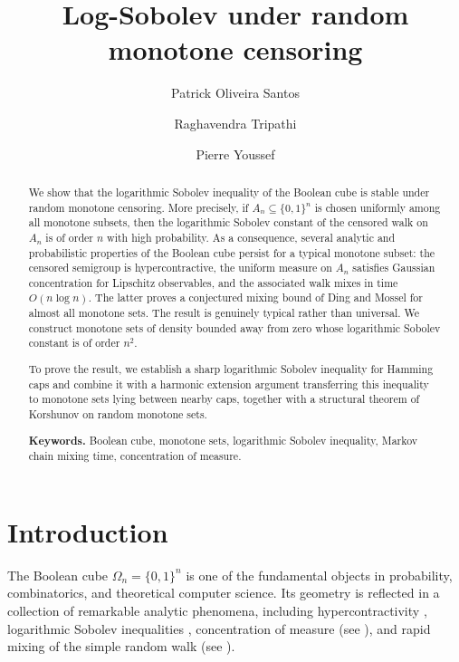 \documentclass[12pt,final]{amsart}
\title{Log-Sobolev under random monotone censoring}
\author[P. O. Santos, R. Tripathi, and P. Youssef]{Patrick Oliveira Santos \and Raghavendra Tripathi \and Pierre Youssef}
\newcommand{\1}{\mathbf{1}}
\begin{document}
\begin{abstract}
We show that the logarithmic Sobolev inequality of the Boolean cube is stable under random monotone censoring. More precisely, if $A_n\subseteq \{0,1\}^n$ is chosen uniformly among all monotone subsets, then the logarithmic Sobolev constant of the censored walk on $A_n$ is of order $n$ with high probability. 
As a consequence, several analytic and probabilistic properties of the Boolean cube persist for a typical monotone subset: the censored semigroup is hypercontractive, the uniform measure on $A_n$  satisfies Gaussian concentration for Lipschitz observables, and the associated walk mixes in time $O(n\log n)$. The latter proves a conjectured mixing bound of Ding and Mossel for almost all monotone sets. 
The result is genuinely typical rather than universal. We construct monotone sets of density bounded away from zero whose logarithmic Sobolev constant is of order $n^2$. 

To prove the result, we establish a sharp logarithmic Sobolev inequality for Hamming caps and combine it with a harmonic extension argument transferring this inequality to monotone sets lying between nearby caps, together with a structural theorem of Korshunov on random monotone sets.

\smallskip
\noindent \textbf{Keywords.} Boolean cube, monotone sets, logarithmic Sobolev inequality, Markov chain mixing time, concentration of measure.
\end{abstract}

\maketitle
\section{Introduction}
\label{sec:intro}

The Boolean cube $\Omega_n=\{0,1\}^n$ is one of the fundamental objects in probability, combinatorics, and theoretical computer science. Its geometry is reflected in a collection of remarkable analytic phenomena, including hypercontractivity \cite{Bon, Beck, Gross}, logarithmic Sobolev inequalities \cite{Gross, Dia96LSI}, concentration of measure (see \cite{Led99Concentration, BLM}), and rapid mixing of the simple random walk (see \cite{Dia96LSI, S-C97}). 
\end{document}
